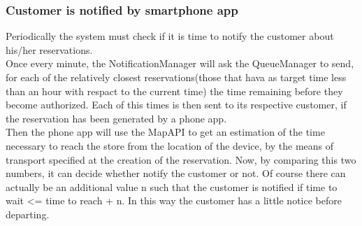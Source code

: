 \subsubsection{Customer is notified by smartphone app}
\begin{figure}[H]
	\noindent
\end{figure}
Periodically the system must check if it is time to notify the customer about his/her reservations.\\
Once every minute, the NotificationManager will ask the QueueManager to send, for each of the relatively closest reservations(those that hava as target time less than an hour with respact to the current time) the time remaining before they become authorized. Each of this times is then sent to its respective customer, if the reservation has been generated by a phone app.\\
Then the phone app will use the MapAPI to get an estimation of the time necessary to reach the store from the location of the device, by the means of transport specified at the creation of the reservation. Now, by comparing this two numbers, it can decide whether notify the customer or not. Of course there can actually be an additional value n such that the customer is notified if time to wait <= time to reach + n. In this way the customer has a little notice before departing.
